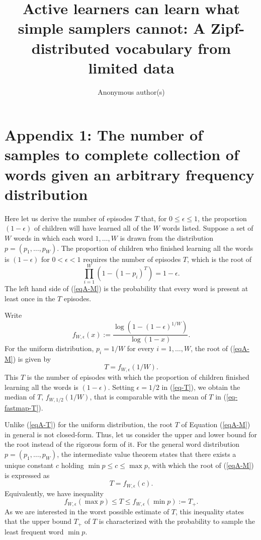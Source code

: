 \documentclass[a4paper,natbib,man]{apa6}
\title{Active learners can learn what simple samplers cannot: A Zipf-distributed vocabulary from limited data}
\author{Anonymous author(s)}
\affiliation{}
\begin{document}
\maketitle

\section{Appendix 1: The number of samples to complete collection of words given an arbitrary frequency distribution}
Here let us derive the number of episodes $T$ that, for $0 \le \epsilon \le 1$, the proportion $(1-\epsilon)$ of children will have learned all of the $W$ words listed.
Suppose a set of $W$ words in which each word $1, \ldots, W$ is drawn from the distribution $p = (p_{1}, \ldots, p_{W})$.
The proportion of children who finished learning all the words is $(1 - \epsilon)$ for $0 < \epsilon < 1$ requires the number of episodes $T$, which is the root of 
\begin{equation}
\label{eqA-M}
 \prod_{i=1}^{W}\left( 1 - ( 1 - p_{i} )^{T} \right) = 1 - \epsilon.
\end{equation}
The left hand side of (\ref{eqA-M}) is the probability that every word is present at least once in the $T$ episodes.

Write 
\[
 f_{W, \epsilon}( x ) := 
\frac{ 
  \log\left( 1 - ( 1 - \epsilon )^{1/W} \right) 
}{ 
  \log\left( 1 - x \right) 
}.
\]
For the uniform distribution, $p_{i} = 1/W$ for every $i = 1, \ldots, W$, 
the root of (\ref{eqA-M}) is given by 
\begin{equation}
\label{eqA-T}
 T = f_{W, \epsilon}( 1/W ).
\end{equation}
This $T$ is the number of episodes with which the proportion of children finished learning all the words is $(1 - \epsilon)$.
Setting $\epsilon = 1/2$ in (\ref{eq-T}), we obtain the median of $T$, $f_{W,1/2}(1/W)$, that is comparable with the mean of $T$ in (\ref{eq-fastmap-T}).

Unlike (\ref{eqA-T}) for the uniform distribution, the root $T$ of Equation (\ref{eqA-M}) in general is not closed-form.
Thus, let us consider the upper and lower bound for the root instead of the rigorous form of it.
For the general word distribution $p = (p_{1}, \ldots, p_{W})$, 
the intermediate value theorem states that  
there exists a unique constant $c$ holding $\min p \le c \le \max p$, with which 
the root of (\ref{eqA-M})  is expressed as
\[
 T = f_{W, \epsilon}( c ).
\]
Equivalently, we have inequality
\begin{equation}
f_{W, \epsilon}( \max p ) \le T \le f_{W, \epsilon}( \min p ) := T_{+}.
\label{eqA-Tbound}
\end{equation}
As we are interested in the worst possible estimate of $T$, 
this inequality states that 
the upper bound $T_{+}$ of $T$ is characterized with 
the probability to sample the least frequent word $\min p$.
\end{document}
